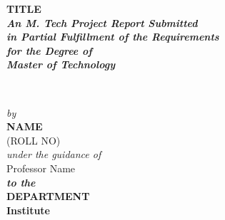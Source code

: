 \begin{center}
		\textheight 15.5in \textwidth 15in {\large\sf  \textbf{TITLE}}\\[12ex]
		{\small{\textsl{ \textbf{An M. Tech Project Report Submitted \\
						in Partial Fulfillment of the Requirements \\
						for the Degree of
						\\[3ex]\small \bf Master of Technology}}}}\\[8ex]  
						\begin{figure}[!h]
						\hfill
						 \hfill \
					\end{figure}				
				\emph{by}\\
		{\sf \sf \textbf{NAME}\\
			(ROLL NO)}\\[1ex]
		\emph{under the guidance of}\\[1ex]
		{Professor Name} \\[3ex]
			
		
		{\sl \bf{to the}} \\[1ex]		
		{\small\bf DEPARTMENT}  \\[1ex]
		{\small \bf{Institute}}
		\\[8ex]
		
	\end{center}

	